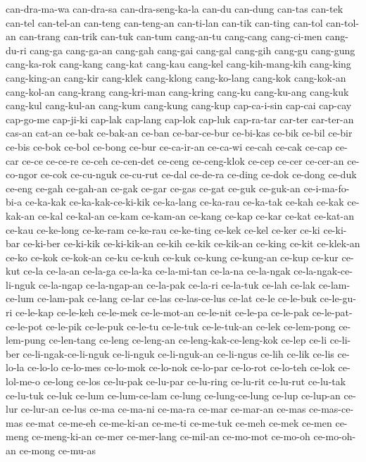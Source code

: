 {can-dra-ma-wa can-dra-sa can-dra-seng-ka-la can-du can-dung can-tas
can-tek can-tel can-tel-an can-teng can-teng-an can-ti-lan can-tik
can-ting can-tol can-tol-an can-trang can-trik can-tuk can-tum cang-an-tu
cang-cang cang-ci-men cang-du-ri cang-ga cang-ga-an cang-gah cang-gai
cang-gal cang-gih cang-gu cang-gung cang-ka-rok cang-kang cang-kat
cang-kau cang-kel cang-kih-mang-kih cang-king cang-king-an cang-kir
cang-klek cang-klong cang-ko-lang cang-kok cang-kok-an cang-kol-an
cang-krang cang-kri-man cang-kring cang-ku cang-ku-ang cang-kuk cang-kul
cang-kul-an cang-kum cang-kung cang-kup cap-ca-i-sin cap-cai cap-cay
cap-go-me cap-ji-ki cap-lak cap-lang cap-lok cap-luk cap-ra-tar car-ter
car-ter-an cas-an cat-an ce-bak ce-bak-an ce-ban ce-bar-ce-bur ce-bi-kas
ce-bik ce-bil ce-bir ce-bis ce-bok ce-bol ce-bong ce-bur ce-ca-ir-an
ce-ca-wi ce-cah ce-cak ce-cap ce-car ce-ce ce-ce-re ce-ceh ce-cen-det
ce-ceng ce-ceng-klok ce-cep ce-cer ce-cer-an ce-co-ngor ce-cok ce-cu-nguk
ce-cu-rut ce-dal ce-de-ra ce-ding ce-dok ce-dong ce-duk ce-eng ce-gah
ce-gah-an ce-gak ce-gar ce-gas ce-gat ce-guk ce-guk-an ce-i-ma-fo-bi-a
ce-ka-kak ce-ka-kak-ce-ki-kik ce-ka-lang ce-ka-rau ce-ka-tak ce-kah ce-kak
ce-kak-an ce-kal ce-kal-an ce-kam ce-kam-an ce-kang ce-kap ce-kar ce-kat
ce-kat-an ce-kau ce-ke-long ce-ke-ram ce-ke-rau ce-ke-ting ce-kek ce-kel
ce-ker ce-ki ce-ki-bar ce-ki-ber ce-ki-kik ce-ki-kik-an ce-kih ce-kik
ce-kik-an ce-king ce-kit ce-klek-an ce-ko ce-kok ce-kok-an ce-ku ce-kuh
ce-kuk ce-kung ce-kung-an ce-kup ce-kur ce-kut ce-la ce-la-an ce-la-ga
ce-la-ka ce-la-mi-tan ce-la-na ce-la-ngak ce-la-ngak-ce-li-nguk ce-la-ngap
ce-la-ngap-an ce-la-pak ce-la-ri ce-la-tuk ce-lah ce-lak ce-lam-ce-lum
ce-lam-pak ce-lang ce-lar ce-las ce-las-ce-lus ce-lat ce-le ce-le-buk
ce-le-gu-ri ce-le-kap ce-le-keh ce-le-mek ce-le-mot-an ce-le-nit ce-le-pa
ce-le-pak ce-le-pat-ce-le-pot ce-le-pik ce-le-puk ce-le-tu ce-le-tuk
ce-le-tuk-an ce-lek ce-lem-pong ce-lem-pung ce-len-tang ce-leng ce-leng-an
ce-leng-kak-ce-leng-kok ce-lep ce-li ce-li-ber ce-li-ngak-ce-li-nguk
ce-li-nguk ce-li-nguk-an ce-li-ngus ce-lih ce-lik ce-lis ce-lo-la ce-lo-lo
ce-lo-mes ce-lo-mok ce-lo-nok ce-lo-par ce-lo-rot ce-lo-teh ce-lok
ce-lol-me-o ce-long ce-los ce-lu-pak ce-lu-par ce-lu-ring ce-lu-rit
ce-lu-rut ce-lu-tak ce-lu-tuk ce-luk ce-lum ce-lum-ce-lam ce-lung
ce-lung-ce-lung ce-lup ce-lup-an ce-lur ce-lur-an ce-lus ce-ma ce-ma-ni
ce-ma-ra ce-mar ce-mar-an ce-mas ce-mas-ce-mas ce-mat ce-me-eh ce-me-ki-an
ce-me-ti ce-me-tuk ce-meh ce-mek ce-men ce-meng ce-meng-ki-an ce-mer
ce-mer-lang ce-mil-an ce-mo-mot ce-mo-oh ce-mo-oh-an ce-mong ce-mu-as
}

